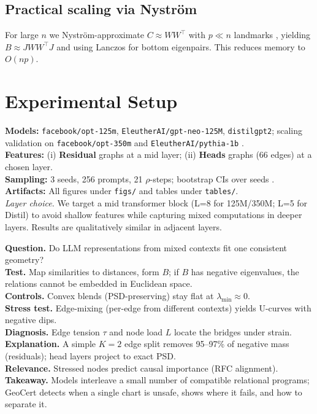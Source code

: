 \documentclass[11pt]{article}
\newcommand{\1}{\mathbf{1}}
\begin{document}
\subsection{Practical scaling via Nyström}\label{sec:nystrom}
For large $n$ we Nyström-approximate $C\approx W W^\top$ with $p\ll n$ landmarks \citep{williams2001nystrom,Fowlkes2004}, yielding $B\approx J W W^\top J$ and using Lanczos for bottom eigenpairs. This reduces memory to $O(np)$.

\section{Experimental Setup}
\textbf{Models:} \texttt{facebook/opt-125m}, \texttt{EleutherAI/gpt-neo-125M}, \texttt{distilgpt2}; scaling validation on \texttt{facebook/opt-350m} and \texttt{EleutherAI/pythia-1b} \citep{Zhang2022OPT,Biderman2023Pythia,Radford2019GPT2,Vaswani2017}.\\
\textbf{Features:} (i) \textbf{Residual} graphs at a mid layer; (ii) \textbf{Heads} graphs (66 edges) at a chosen layer.\\
\textbf{Sampling:} 3 seeds, 256 prompts, 21 $\rho$-steps; bootstrap CIs over seeds \citep{Efron1979}.\\
\textbf{Artifacts:} All figures under \texttt{figs/} and tables under \texttt{tables/}.\\[0.25em]
\textit{Layer choice.} We target a mid transformer block (L=8 for 125M/350M; L=5 for Distil) to avoid shallow features while capturing mixed computations in deeper layers. Results are qualitatively similar in adjacent layers.

\begin{tcolorbox}[title=Executive Summary]
\textbf{Question.} Do LLM representations from mixed contexts fit one consistent geometry? \\
\textbf{Test.} Map similarities to distances, form $B$; if $B$ has negative eigenvalues, the relations cannot be embedded in Euclidean space. \\
\textbf{Controls.} Convex blends (PSD-preserving) stay flat at $\lambda_{\min}\!\approx\!0$. \\
\textbf{Stress test.} Edge-mixing (per-edge from different contexts) yields U-curves with negative dips. \\
\textbf{Diagnosis.} Edge tension $\tau$ and node load $L$ locate the bridges under strain. \\
\textbf{Explanation.} A simple $K{=}2$ edge split removes 95--97\% of negative mass (residuals); head layers project to exact PSD. \\
\textbf{Relevance.} Stressed nodes predict causal importance (RFC alignment). \\
\textbf{Takeaway.} Models interleave a small number of compatible relational programs; GeoCert detects when a single chart is unsafe, shows where it fails, and how to separate it.
\end{tcolorbox}
\end{document}
